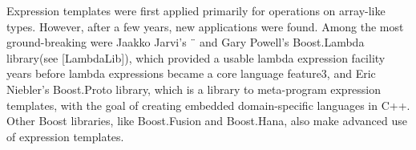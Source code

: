Expression templates were first applied primarily for operations on array-like types. However, after a few years, new applications were found. Among the most ground-breaking were Jaakko Jarvi’s ¨ and Gary Powell’s Boost.Lambda library(see [LambdaLib]), which provided a usable lambda expression facility years before lambda expressions became a core language feature3, and Eric Niebler’s Boost.Proto library, which is a library to meta-program expression templates, with the goal of creating embedded domain-specific languages in C++. Other Boost libraries, like Boost.Fusion and Boost.Hana, also make advanced use of expression templates.



































